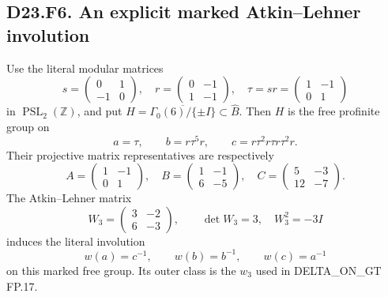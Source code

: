 
\subsection*{D23.F6. An explicit marked Atkin--Lehner involution}
Use the literal modular matrices
\[
 s=\begin{pmatrix}0&1\\-1&0\end{pmatrix},\quad
 r=\begin{pmatrix}0&-1\\1&-1\end{pmatrix},\quad
 \tau=sr=\begin{pmatrix}1&-1\\0&1\end{pmatrix}
\]
in $\operatorname{PSL}_2(\mathbb Z)$, and put
$H=\overline{\Gamma_0(6)/\{\pm I\}}\subset\widehat B$.
Then $H$ is the free profinite group on
\[
 a=\tau,\qquad b=r\tau^5r,\qquad
 c=r\tau^2r\tau r\tau^2r.
 \tag{D23.F6.1}
\]
Their projective matrix representatives are respectively
\[
 A=\begin{pmatrix}1&-1\\0&1\end{pmatrix},\quad
 B=\begin{pmatrix}1&-1\\6&-5\end{pmatrix},\quad
 C=\begin{pmatrix}5&-3\\12&-7\end{pmatrix}.
\]
The Atkin--Lehner matrix
\[
 W_3=\begin{pmatrix}3&-2\\6&-3\end{pmatrix},\qquad
 \det W_3=3,\quad W_3^2=-3I
\]
induces the literal involution
\[
 w(a)=c^{-1},\qquad w(b)=b^{-1},\qquad w(c)=a^{-1}
 \tag{D23.F6.2}
\]
on this marked free group. Its outer class is the $w_3$ used
in DELTA\_ON\_GT FP.17.

